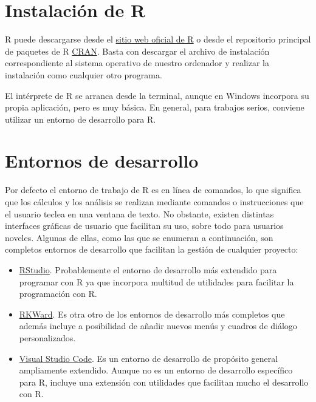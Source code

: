 \documentclass[
  a4paper,
]{scrreport}
\theoremstyle{definition}
\theoremstyle{remark}
\begin{document}
\hypertarget{instalaciuxf3n-de-r}{%
\section{Instalación de R}\label{instalaciuxf3n-de-r}}

R puede descargarse desde el \href{https://www.r-project.org/}{sitio web
oficial de R} o desde el repositorio principal de paquetes de R
\href{https://cran.r-project.org/}{CRAN}. Basta con descargar el archivo
de instalación correspondiente al sistema operativo de nuestro ordenador
y realizar la instalación como cualquier otro programa.

El intérprete de R se arranca desde la terminal, aunque en Windows
incorpora su propia aplicación, pero es muy básica. En general, para
trabajos serios, conviene utilizar un entorno de desarrollo para R.

\hypertarget{entornos-de-desarrollo}{%
\section{Entornos de desarrollo}\label{entornos-de-desarrollo}}

Por defecto el entorno de trabajo de R es en línea de comandos, lo que
significa que los cálculos y los análisis se realizan mediante comandos
o instrucciones que el usuario teclea en una ventana de texto. No
obstante, existen distintas interfaces gráficas de usuario que facilitan
su uso, sobre todo para usuarios noveles. Algunas de ellas, como las que
se enumeran a continuación, son completos entornos de desarrollo que
facilitan la gestión de cualquier proyecto:

\begin{itemize}
\item
  \href{https://www.rstudio.com/}{RStudio}. Probablemente el entorno de
  desarrollo más extendido para programar con R ya que incorpora
  multitud de utilidades para facilitar la programación con R.
\item
  \href{https://rkward.kde.org}{RKWard}. Es otra otro de los entornos de
  desarrollo más completos que además incluye a posibilidad de añadir
  nuevos menús y cuadros de diálogo personalizados.
\item
  \href{https://code.visualstudio.com/}{Visual Studio Code}. Es un
  entorno de desarrollo de propósito general ampliamente extendido.
  Aunque no es un entorno de desarrollo específico para R, incluye una
  extensión con utilidades que facilitan mucho el desarrollo con R.
\end{itemize}
\end{document}
